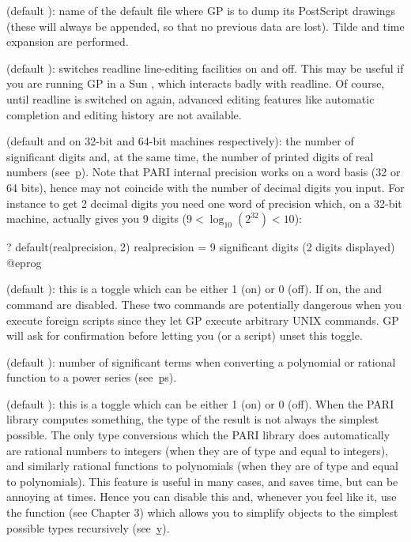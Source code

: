  (default ): name of the default file where
GP is to dump its PostScript drawings (these will always be appended, so that
no previous data are lost). Tilde and time expansion are performed.

 (default ): switches readline line-editing
facilities on and off. This may be useful if you are running GP in a Sun
, which interacts badly with readline. Of course, until readline
is switched on again, advanced editing features like automatic completion
and editing history are not available.

 (default  and  on 32-bit and 64-bit machines respectively): the number of significant digits and, at the same
time, the number of printed digits of real numbers (see~\b{p}). Note that
PARI internal precision works on a word basis (32 or 64 bits), hence may not
coincide with the number of decimal digits you input. For instance to get 2
decimal digits you need one word of precision which, on a 32-bit machine,
actually gives you 9 digits ($9 < \log_{10}(2^{32}) < 10$):

\bprog
? default(realprecision, 2)
      realprecision = 9 significant digits (2 digits displayed)
@eprog

 (default ): this is a toggle which can be either 1
(on) or 0 (off). If on, the  and  command are
disabled. These two commands are potentially dangerous when you execute
foreign scripts since they let GP execute arbitrary UNIX commands. GP will
ask for confirmation before letting you (or a script) unset this toggle.

 (default ): number of significant terms
when converting a polynomial or rational function to a power series
(see~\b{ps}).

 (default ): this is a toggle which can be either
1 (on) or 0 (off). When the PARI library computes something, the type of the
result is not always the simplest possible. The only type conversions which
the PARI library does automatically are rational numbers to integers (when
they are of type  and equal to integers), and similarly rational
functions to polynomials (when they are of type  and equal to
polynomials). This feature is useful in many cases, and saves time, but can
be annoying at times. Hence you can disable this and, whenever you feel like
it, use the function  (see Chapter 3) which allows you to
simplify objects to the simplest possible types recursively (see~\b{y}).

